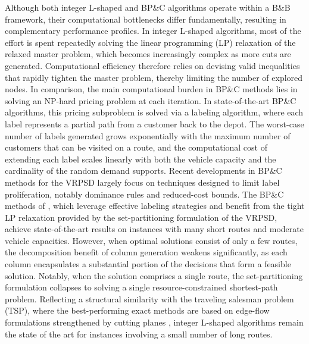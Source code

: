 \documentclass{article}
\begin{document}
Although both integer L-shaped and BP\&C algorithms operate within a B\&B framework, their computational bottlenecks differ fundamentally, resulting in complementary performance profiles. In integer L-shaped algorithms, most of the effort is spent repeatedly solving the linear programming (LP) relaxation of the relaxed master problem, which becomes increasingly complex as more cuts are generated. Computational efficiency therefore relies on devising valid inequalities that rapidly tighten the master problem, thereby limiting the number of explored nodes. In comparison, the main computational burden in BP\&C methods lies in solving an NP-hard pricing problem \cite{ota2025hardness} at each iteration. In state-of-the-art BP\&C algorithms, this pricing subproblem is solved via a labeling algorithm, where each label represents a partial path from a customer back to the depot. The worst-case number of labels generated grows exponentially with the maximum number of customers that can be visited on a route, and the computational cost of extending each label scales linearly with both the vehicle capacity and the cardinality of the random demand supports. Recent developments in BP\&C methods for the VRPSD largely focus on techniques designed to limit label proliferation, notably dominance rules and reduced-cost bounds. The BP\&C methods of \cite{florio2020new, florio2023recent}, which leverage effective labeling strategies and benefit from the tight LP relaxation provided by the set-partitioning formulation of the VRPSD, achieve state-of-the-art results on instances with many short routes and moderate vehicle capacities. However, when optimal solutions consist of only a few routes, the decomposition benefit of column generation weakens significantly, as each column encapsulates a substantial portion of the decisions that form a feasible solution. Notably, when the solution comprises a single route, the set-partitioning formulation collapses to solving a single resource-constrained shortest-path problem. Reflecting a structural similarity with the traveling salesman problem (TSP), where the best-performing exact methods are based on edge-flow formulations strengthened by cutting planes \cite{applegate2006traveling}, integer L-shaped algorithms remain the state of the art for instances involving a small number of long routes.

\end{document}
